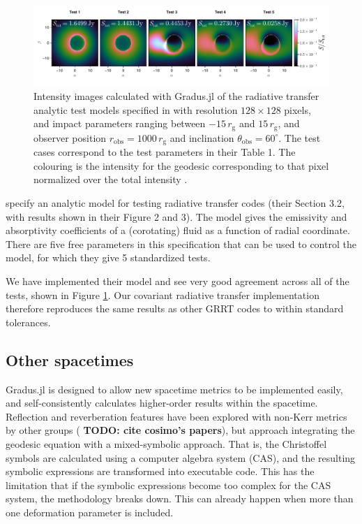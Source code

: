 \documentclass[fleqn,usenatbib]{mnras}
\newcommand{\todo}[1]{{\noindent \bf \color{red} TODO: #1}}
\newcommand{\Gradus}{Gradus.jl\xspace}
\newcommand{\rg}{r_\text{g}}
\begin{document}
\begin{figure}
	\centering
	\includegraphics[width=0.99\linewidth]{figures/radiative-transfer.gold.pdf}
	\caption{Intensity images calculated with \Gradus of the radiative transfer analytic test models specified in \citet{gold_verification_2020} with resolution $128 \times 128$ pixels, and impact parameters ranging between $-15\, \rg$ and $15\, \rg$, and observer position $r_\text{obs} = 1000\, \rg$ and inclination $\theta_\text{obs} = 60^\circ$. The test cases correspond to the test parameters in their Table 1. The colouring is the intensity for the geodesic corresponding to that pixel normalized over the total intensity .}
	\label{fig:gold-test-problems}
\end{figure}

\cite{gold_verification_2020} specify an analytic model for testing radiative
transfer codes (their Section 3.2, with results shown in their Figure 2 and 3).
The model gives the emissivity and absorptivity coefficients of a (corotating)
fluid as a function of radial coordinate. There are five free parameters in this
specification that can be used to control the model, for which they give 5
standardized tests.

We have implemented their model and see very good agreement across all of the
tests, shown in Figure \ref{fig:gold-test-problems}. Our covariant radiative
transfer implementation therefore reproduces the same results as other GRRT
codes to within standard tolerances.

\subsection{Other spacetimes}

\Gradus is designed to allow new spacetime metrics to be implemented easily, and
self-consistently calculates higher-order results within the spacetime.
Reflection and reverberation features have been explored with non-Kerr metrics
by other groups (\todo{cite cosimo's papers}), but approach integrating the
geodesic equation with a mixed-symbolic approach. That is, the Christoffel
symbols are calculated using a computer algebra system (CAS), and the resulting
symbolic expressions are transformed into executable code. This has the
limitation that if the symbolic expressions become too complex for the CAS
system, the methodology breaks down. This can already happen when more than one
deformation parameter is included.
\end{document}
